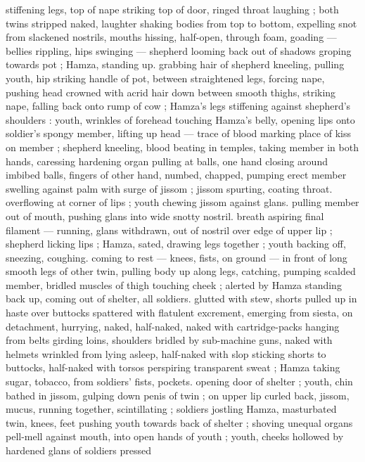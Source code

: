 {stiffening legs, top of nape striking top of door, ringed throat 
laughing ; both twins stripped naked, laughter shaking bodies from 
top to bottom, expelling snot from slackened nostrils, mouths 
hissing, half-open, through foam, goading --- bellies rippling, hips 
swinging --- shepherd looming back out of shadows groping towards 
pot ; Hamza, standing up. grabbing hair of shepherd kneeling, 
pulling youth, hip striking handle of pot, between straightened legs, 
forcing nape, pushing head crowned with acrid hair down between 
smooth thighs, striking nape, falling back onto rump of cow ; 
Hamza's legs stiffening against shepherd's shoulders : youth, 
wrinkles of forehead touching Hamza's belly, opening lips onto 
soldier's spongy member, lifting up head --- trace of blood marking 
place of kiss on member ; shepherd kneeling, blood beating in 
temples, taking member in both hands, caressing hardening organ 
pulling at balls, one hand closing around imbibed balls, fingers of 
other hand, numbed, chapped, pumping erect member swelling 
against palm with surge of jissom ; jissom spurting, coating throat. 
overflowing at corner of lips ; youth chewing jissom against glans. 
pulling member out of mouth, pushing glans into wide snotty nostril. 
breath aspiring final filament --- running, glans withdrawn, out of 
nostril over edge of upper lip ; shepherd licking lips ; Hamza, sated, 
drawing legs together ; youth backing off, sneezing, coughing. 
coming to rest --- knees, fists, on ground --- in front of long smooth 
legs of other twin, pulling body up along legs, catching, pumping 
scalded member, bridled muscles of thigh touching cheek ; alerted 
by Hamza standing back up, coming out of shelter, all soldiers. 
glutted with stew, shorts pulled up in haste over buttocks spattered 
with flatulent excrement, emerging from siesta, on detachment, 
hurrying, naked, half-naked, naked with cartridge-packs hanging 
from belts girding loins, shoulders bridled by sub-machine guns, 
naked with helmets wrinkled from lying asleep, half-naked with slop 
sticking shorts to buttocks, half-naked with torsos perspiring 
transparent sweat ; Hamza taking sugar, tobacco, from soldiers' fists, 
pockets. opening door of shelter ; youth, chin bathed in jissom, 
gulping down penis of twin ; on upper lip curled back, jissom, mucus, 
running together, scintillating ; soldiers jostling Hamza, masturbated 
twin, knees, feet pushing youth towards back of shelter ; shoving 
unequal organs pell-mell against mouth, into open hands of youth ; 
youth, cheeks hollowed by hardened glans of soldiers pressed 
}
